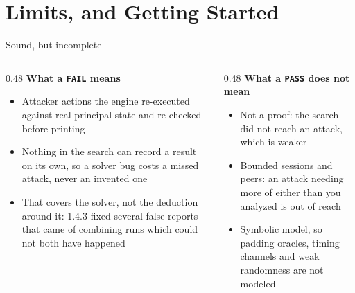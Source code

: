 \ifdefined\PRESENTATION\else\PassOptionsToClass{handout}{beamer}\fi\documentclass[aspectratio=169, lualatex]{beamer}
\begin{document}
\section{Limits, and Getting Started}

\begin{frame}{Sound, but incomplete}
	\scriptsize
	\begin{columns}[t]
		\begin{column}{0.48\textwidth}
			\textbf{What a \texttt{FAIL} means}
			\begin{itemize}
				\item Attacker actions the engine re-executed against real principal state and re-checked before printing
				\item Nothing in the search can record a result on its own, so a solver bug costs a missed attack, never an invented one
				\item That covers the solver, not the deduction around it: 1.4.3 fixed several false reports that came of combining runs which could not both have happened
			\end{itemize}
		\end{column}
		\begin{column}{0.48\textwidth}
			\textbf{What a \texttt{PASS} does not mean}
			\begin{itemize}
				\item Not a proof: the search did not reach an attack, which is weaker
				\item Bounded sessions and peers: an attack needing more of either than you analyzed is out of reach
				\item Symbolic model, so padding oracles, timing channels and weak randomness are not modeled
			\end{itemize}
		\end{column}
	\end{columns}
\end{frame}
\end{document}
